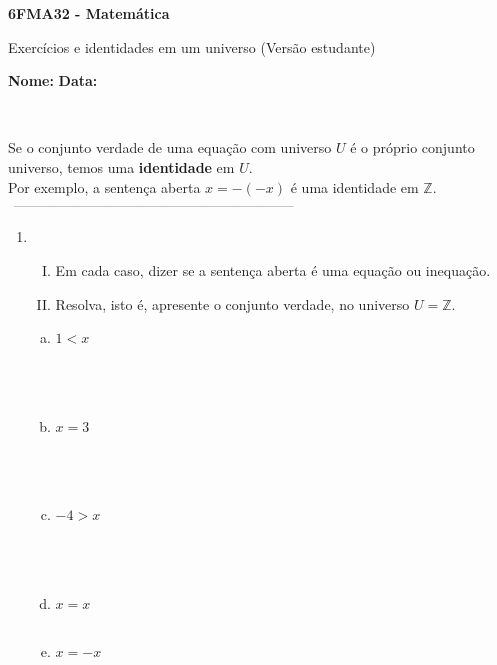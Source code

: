 \documentclass[a4paper,14pt]{article}
\begin{document}
	
	\noindent\textbf{6FMA32 - Matemática} 
	
	\begin{center}Exercícios e identidades em um universo (Versão estudante)
	\end{center}
	
	\noindent\textbf{Nome:} \underline{\hspace{10cm}}
	\noindent\textbf{Data:} \underline{\hspace{4cm}}
	
	~ \\
    \begin{multicols}{2}
    	\noindent Se o conjunto verdade de uma equação com universo $U$ é o próprio conjunto universo, temos uma \textbf{identidade} em $U$. 
    	\\
    	Por exemplo, a sentença aberta $x = -(-x)$ é uma identidade em $\mathbb{Z}$.
    	\noindent\textsubscript{~------------------------------------------------------------------------}
    	\begin{enumerate}
    		\item \begin{enumerate}[I.]
    			\item Em cada caso, dizer se a sentença aberta é uma equação ou inequação.
    			\item Resolva, isto é, apresente o conjunto verdade, no universo $U = \mathbb{Z}$.
    		\end{enumerate}
    		\begin{enumerate}[a)]
    			\item $1 < x$ \\\\\\\\
    			\item $x = 3$ \\\\\\\\
    			\item $-4 > x$ \\\\\\\\
    			\item $x = x$ \\\\
    			\item $x = -x$ \\\\\\\\

\end{enumerate}
\end{enumerate}
\end{multicols}
\end{document}
